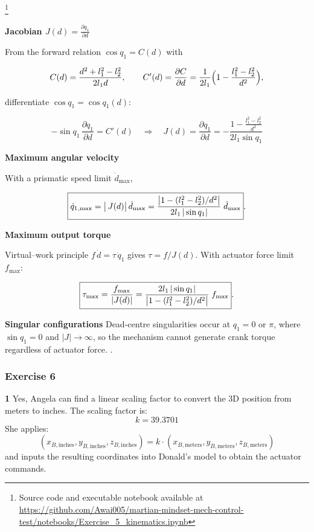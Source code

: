\documentclass[12pt,a4paper]{article}
\begin{document}
\footnote{Source code and executable notebook available at
\url{https://github.com/Awai005/martian-mindset-mech-control-test/notebooks/Exercise_5_kinematics.ipynb}}




\textbf{Jacobian  \(\displaystyle J(d)=\frac{\partial q_{1}}{\partial d}\)}

From the forward relation \(\cos q_{1}=C(d)\) with

\[
C(d)=\frac{d^{2}+l_{1}^{2}-l_{2}^{2}}{2l_{1}d},
\qquad
C'(d)=\frac{\partial C}{\partial d}
      =\frac{1}{2l_{1}}\Bigl(1-\frac{l_{1}^{2}-l_{2}^{2}}{d^{2}}\Bigr),
\]

differentiate \(\cos q_{1}=\cos q_{1}(d)\):

\[
-\sin q_{1}\,\frac{\partial q_{1}}{\partial d}=C'(d)
\quad\Longrightarrow\quad
%
J(d)=\frac{\partial q_{1}}{\partial d}
     =-\frac{1-\displaystyle\frac{l_{1}^{2}-l_{2}^{2}}{d^{2}}}
            {2l_{1}\sin q_{1}}
\]

\textbf{Maximum angular velocity}

With a prismatic speed limit \(\dot d_{\max}\),

\[
\boxed{%
\dot q_{1,\max}
      =\bigl|\,J(d)\bigr|\,\dot d_{\max}
      =\frac{\bigl|1-(l_{1}^{2}-l_{2}^{2})/d^{2}\bigr|}
             {2l_{1}\,|\sin q_{1}|}\;\dot d_{\max}}.
\]

\textbf{Maximum output torque}

Virtual–work principle \(f\,\dot d=\tau\,\dot q_{1}\) gives
\(\tau =f/J(d)\).  With actuator force limit \(f_{\max}\):

\[
\boxed{%
\tau_{\max}
      =\frac{f_{\max}}{|J(d)|}
      =\frac{2l_{1}\,|\sin q_{1}|}
             {\bigl|1-(l_{1}^{2}-l_{2}^{2})/d^{2}\bigr|}\;f_{\max}}.
\]




\textbf{Singular configurations}
Dead-centre singularities occur at \(q_{1}=0\) or \(\pi\),
where \(\sin q_{1}=0\) and \(|J|\to\infty\), so the mechanism cannot
generate crank torque regardless of actuator force. \cite{Spong2006}.





\subsubsection*{Exercise 6}
\textbf{1} Yes, Angela can find a linear scaling factor to convert the 3D position from meters to inches. The scaling factor is: 
$$k = 39.3701$$
She applies:
$$(x_{B,\text{inches}}, y_{B,\text{inches}}, z_{B,\text{inches}}) = k \cdot (x_{B,\text{meters}}, y_{B,\text{meters}}, z_{B,\text{meters}})$$
and inputs the resulting coordinates into Donald’s model to obtain the actuator commands.
\end{document}
